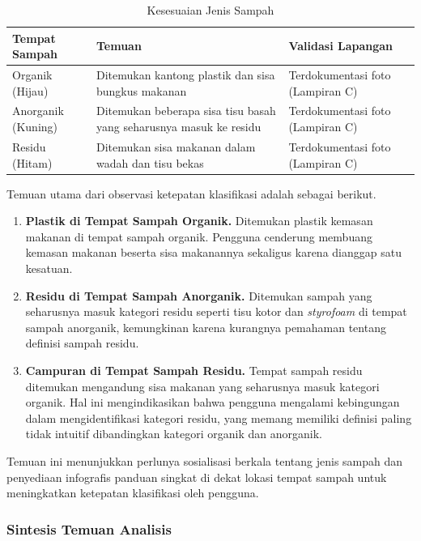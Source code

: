 \begin{table}[H]
  \caption{Kesesuaian Jenis Sampah}
  \label{tab:kesesuaian-jenis}
  \begin{tabularx}{\textwidth}{| l | X | l |}
    \hline
    \textbf{Tempat Sampah} & \textbf{Temuan} & \textbf{Validasi Lapangan} \\
    \hline
    Organik (Hijau) & Ditemukan kantong plastik dan sisa bungkus makanan & Terdokumentasi foto (Lampiran C) \\
    \hline
    Anorganik (Kuning) & Ditemukan beberapa sisa tisu basah yang seharusnya masuk ke residu & Terdokumentasi foto (Lampiran C) \\
    \hline
    Residu (Hitam) & Ditemukan sisa makanan dalam wadah dan tisu bekas & Terdokumentasi foto (Lampiran C) \\
    \hline
  \end{tabularx}
\end{table}

Temuan utama dari observasi ketepatan klasifikasi adalah sebagai berikut.

\begin{enumerate}
  \item \textbf{Plastik di Tempat Sampah Organik.} Ditemukan plastik kemasan makanan di tempat sampah organik. Pengguna cenderung membuang kemasan makanan beserta sisa makanannya sekaligus karena dianggap satu kesatuan.

  \item \textbf{Residu di Tempat Sampah Anorganik.} Ditemukan sampah yang seharusnya masuk kategori residu seperti tisu kotor dan \textit{styrofoam} di tempat sampah anorganik, kemungkinan karena kurangnya pemahaman tentang definisi sampah residu.

  \item \textbf{Campuran di Tempat Sampah Residu.} Tempat sampah residu ditemukan mengandung sisa makanan yang seharusnya masuk kategori organik. Hal ini mengindikasikan bahwa pengguna mengalami kebingungan dalam mengidentifikasi kategori residu, yang memang memiliki definisi paling tidak intuitif dibandingkan kategori organik dan anorganik.
\end{enumerate}

Temuan ini menunjukkan perlunya sosialisasi berkala tentang jenis sampah dan penyediaan infografis panduan singkat di dekat lokasi tempat sampah untuk meningkatkan ketepatan klasifikasi oleh pengguna.

\subsubsection{Sintesis Temuan Analisis}
\label{sec:sintesis-temuan}

